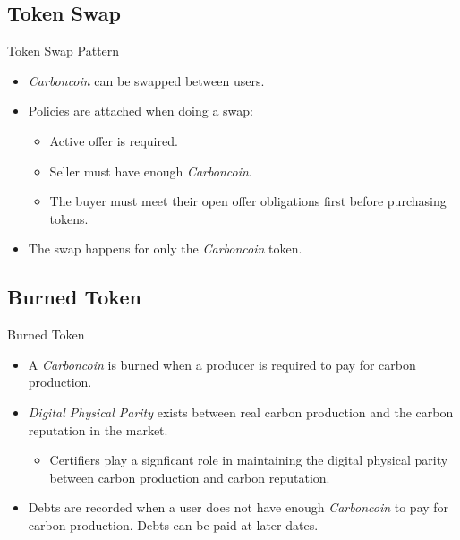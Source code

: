 \subsection{Token Swap}
\begin{frame}{Token Swap Pattern}
    \begin{itemize}
        \item \textit{Carboncoin} can be swapped between users.
        \item Policies are attached when doing a swap:
              \begin{itemize}
                  \item Active offer is required.
                  \item Seller must have enough \textit{Carboncoin}.
                  \item The buyer must meet their open offer obligations first
                        before purchasing tokens.
              \end{itemize}
        \item The swap happens for only the \textit{Carboncoin} token.
    \end{itemize}
\end{frame}
\subsection{Burned Token}
\begin{frame}{Burned Token}
    \begin{itemize}
        \item A \textit{Carboncoin} is burned when a producer is required
              to pay for carbon production.
        \item \textit{Digital Physical Parity} exists between real carbon
              production and the carbon reputation in the market.
              \begin{itemize}
                  \item Certifiers play a signficant role in maintaining the
                        digital physical parity between carbon production and
                        carbon reputation.
              \end{itemize}
        \item Debts are recorded when a user does not have enough
              \textit{Carboncoin} to pay for carbon production. Debts can
              be paid at later dates.
    \end{itemize}
\end{frame}